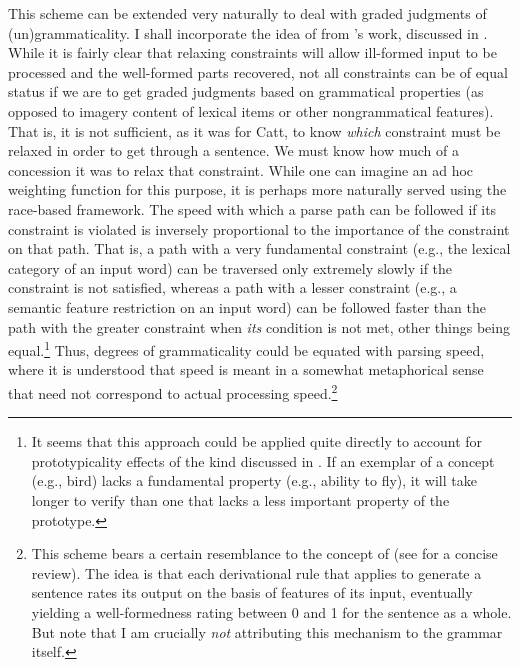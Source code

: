  This scheme can be extended very naturally to deal with graded judgments of (un)grammaticality. I shall incorporate the idea of  from
 's  work, discussed in . While it is fairly clear that relaxing constraints will allow ill-formed input to be processed and the well-formed parts recovered, not all constraints can be of equal status if we are to get graded judgments based on grammatical properties (as opposed to imagery content of lexical items or other nongrammatical features). That is, it is not sufficient, as it was for Catt, to know \textit{which} constraint must be relaxed in order to get through a sentence. We must know how much of a concession it was to relax that constraint. While one can imagine an ad hoc weighting function for this purpose, it is perhaps more naturally served using the race-based framework. The speed with which a parse path can be followed if its constraint is violated is inversely proportional to the importance of the constraint on that path. That is, a path with a very fundamental constraint (e.g., the lexical category of an input word) can be traversed only extremely slowly if the constraint is not satisfied, whereas a path with a lesser constraint (e.g., a semantic feature restriction on an input word) can be followed faster than the path with the greater constraint when \textit{its} condition is not met, other things being equal.\footnote{It seems that this approach could be applied quite directly to account for prototypicality effects of the kind discussed in . If an exemplar of a concept (e.g., bird) lacks a fundamental property (e.g., ability to fly), it will take longer to verify than one that lacks a less important property of the prototype.}
  Thus, degrees of grammaticality could be equated with parsing speed, where it is understood that speed is meant in a somewhat metaphorical sense that need not correspond to actual processing speed.\footnote{This scheme bears a certain resemblance to the concept of  (see \citet{Mohan1977} for a concise review). The idea is that each derivational rule that applies to generate a sentence rates its output on the basis of features of its input, eventually yielding a well-formedness rating between 0 and 1 for the sentence as a whole. But note that I am crucially \textit{not} attributing this mechanism to the grammar itself.}


